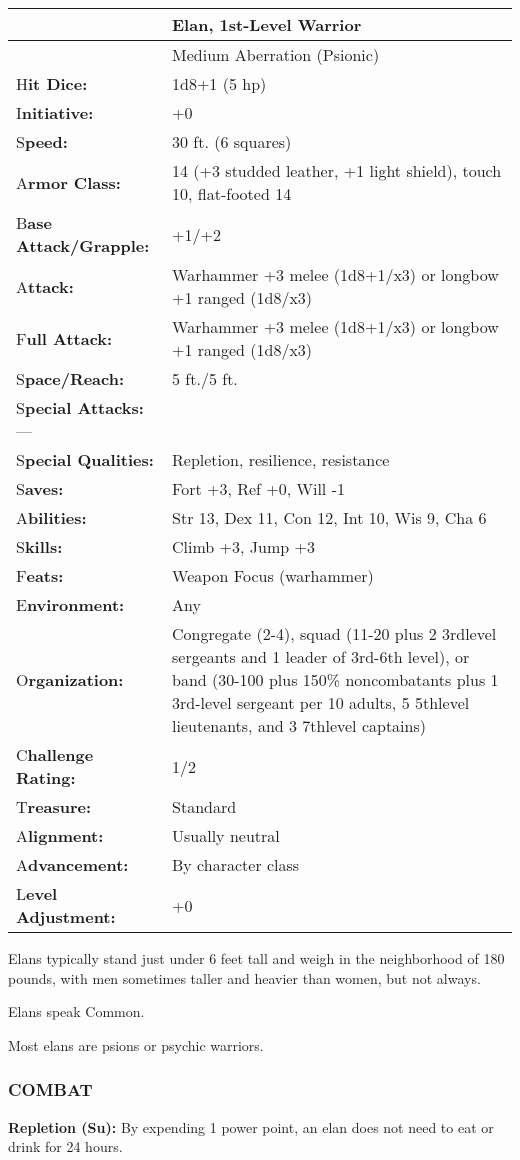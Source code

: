 \documentclass{article}
\begin{document}
\begin{tabular}{|>{\raggedright}p{81pt}|>{\raggedright}p{244pt}|}
\hline
  & Elan, 1st-Level Warrior\tabularnewline
\hline
  & Medium Aberration (Psionic)\tabularnewline
\hline
H\textbf{it Dice:} & 1d8+1 (5 hp)\tabularnewline
\hline
I\textbf{nitiative:} & +0\tabularnewline
\hline
S\textbf{peed:} & 30 ft. (6 squares)\tabularnewline
\hline
A\textbf{rmor Class:} & 14 (+3 studded leather, +1 light shield), touch 10, flat-footed 
14\tabularnewline
\hline
B\textbf{ase Attack/Grapple:} & +1/+2\tabularnewline
\hline
A\textbf{ttack:} & Warhammer +3 melee (1d8+1/x3) or longbow +1 ranged (1d8/x3)\tabularnewline
\hline
F\textbf{ull Attack:} & Warhammer +3 melee (1d8+1/x3) or longbow +1 ranged (1d8/x3)\tabularnewline
\hline
S\textbf{pace/Reach:} & 5 ft./5 ft.\tabularnewline
\hline
S\textbf{pecial Attacks:}--- & \tabularnewline
\hline
S\textbf{pecial Qualities:} & Repletion, resilience, resistance\tabularnewline
\hline
S\textbf{aves:} & Fort +3, Ref +0, Will -1\tabularnewline
\hline
A\textbf{bilities:} & Str 13, Dex 11, Con 12, Int 10, Wis 9, Cha 6\tabularnewline
\hline
S\textbf{kills:} & Climb +3, Jump +3\tabularnewline
\hline
F\textbf{eats:} & Weapon Focus (warhammer)\tabularnewline
\hline
E\textbf{nvironment:} & Any\tabularnewline
\hline
O\textbf{rganization:} & Congregate (2-4), squad (11-20 plus 2 3rdlevel sergeants 
and 1 leader of 3rd-6th level), or band (30-100 plus 150\% noncombatants plus 1 
3rd-level sergeant per 10 adults, 5 5thlevel lieutenants, and 3 7thlevel captains)\tabularnewline
\hline
C\textbf{hallenge Rating:} & 1/2\tabularnewline
\hline
T\textbf{reasure:} & Standard\tabularnewline
\hline
A\textbf{lignment:} & Usually neutral\tabularnewline
\hline
A\textbf{dvancement:} & By character class\tabularnewline
\hline
L\textbf{evel Adjustment:} & +0\tabularnewline
\hline
\end{tabular}

Elans typically stand just under 6 feet tall and weigh in the neighborhood of 180 
pounds, with men sometimes taller and heavier than women, but not always.

Elans speak Common.

Most elans are psions or psychic warriors.

\subsubsection*{COMBAT}

\textbf{Repletion (Su):} By expending 1 power point, an elan does not need to eat 
or drink for 24 hours. 
\end{document}
